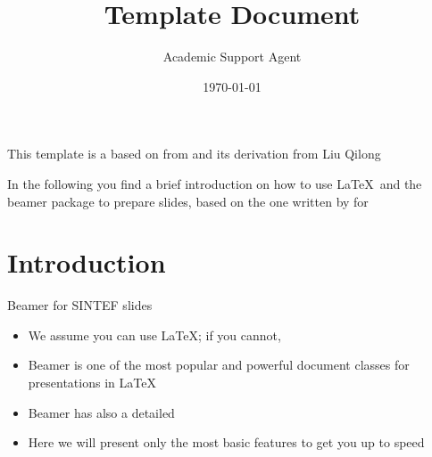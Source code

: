 \documentclass{article}
\title{Template Document}
\author{Academic Support Agent}
\date{\today}
\begin{document}
\maketitle

\maketitle

\begin{frame}

This template is a based on  from  and its derivation  from Liu Qilong

\vspace{\baselineskip}

In the following you find a brief introduction on how to use \LaTeX\ and the beamer package to prepare slides, based on the one written by  for 


\end{frame}

\section{Introduction}

\begin{frame}{Beamer for SINTEF slides}
\begin{itemize}
\item We assume you can use \LaTeX; if you cannot,
\item Beamer is one of the most popular and powerful document
classes for presentations in \LaTeX
\item Beamer has also a detailed
\item Here we will present only the most basic features to get you up to speed
\end{itemize}
\end{frame}
\end{document}
